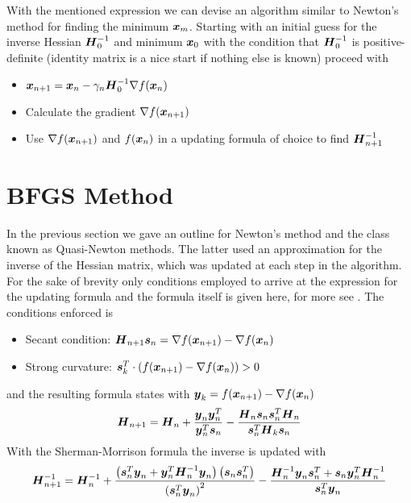     With the mentioned expression we can devise an algorithm similar to
    Newton's method for finding the minimum $\boldsymbol{{x}}_m$. Starting with an
    initial guess for the inverse Hessian $\boldsymbol{{H}}^{-1}_0$ and minimum
    $\boldsymbol{{x}}_0$ with the condition that $\boldsymbol{{H}}^{-1}_0$ is positive-definite
    (identity matrix is a nice start if nothing else is known) proceed with
        \begin{itemize}
            \item $\boldsymbol{{x}}_{n+1} = \boldsymbol{{x}}_n -\gamma_n\boldsymbol{{H}}^{-1}_0\nabla
                f(\boldsymbol{{x}}_n)$
            \item Calculate the gradient $\nabla f(\boldsymbol{{x}}_{n+1})$
            \item Use $\nabla f(\boldsymbol{{x}}_{n+1})$ and $f(\boldsymbol{{x}}_n)$ in a
                updating formula of choice to find $\boldsymbol{{H}}^{-1}_{n+1}$
        \end{itemize}

\section{BFGS Method\label{sec:BFGS}}
    In the previous section we gave an outline for Newton's method and the
    class known as Quasi-Newton methods. The latter used an approximation for
    the inverse of the Hessian matrix, which was updated at each step in the
    algorithm. For the sake of brevity only conditions employed to arrive at
    the expression for the updating formula and the formula itself is given
    here, for more see \cite{BFGSB, BFGSF, BFGSG, BFGSS, numOptNocWrig}. The
    conditions enforced is
        \begin{itemize}
            \item Secant condition: $\boldsymbol{{H}}_{n+1} \boldsymbol{{s}}_n = \nabla
                f(\boldsymbol{{x}}_{n+1}) - \nabla f(\boldsymbol{{x}}_n)$
            \item Strong curvature: $\boldsymbol{{s}}^T_k\cdot (f(\boldsymbol{{x}}_{n+1}) -
                \nabla f(\boldsymbol{{x}}_n)) > 0$
        \end{itemize}
    and the resulting formula states with $\boldsymbol{{y}}_k = f(\boldsymbol{{x}}_{n+1}) -
    \nabla f(\boldsymbol{{x}}_n)$
        \begin{equation}
            \boldsymbol{{H}}_{n+1} = \boldsymbol{{H}}_n +
            \frac{\boldsymbol{{y}}_n\boldsymbol{{y}}^T_n}{\boldsymbol{{y}}^T_n \boldsymbol{{s}}_n} -
            \frac{\boldsymbol{{H}}_n\boldsymbol{{s}}_n\boldsymbol{{s}}^T_n\boldsymbol{{H}}_n}
            {\boldsymbol{{s}}^T_n\boldsymbol{{H}}_k\boldsymbol{{s}}_n}
            \label{eq:BFGSdef}
        \end{equation}
    With the Sherman-Morrison formula\cite{shermorInv} the inverse is updated
    with
        \begin{equation}
            \boldsymbol{{H}}^{-1}_{n+1} = \boldsymbol{{H}}^{-1}_n +
            \frac{\left(\boldsymbol{{s}}^T_n\boldsymbol{{y}}_n +
            \boldsymbol{{y}}^T_n\boldsymbol{{H}}^{-1}_n\boldsymbol{{y}}_n\right)
            \left(\boldsymbol{{s}}_n\boldsymbol{{s}}^T_n\right)}
            {\left(\boldsymbol{{s}}^T_n\boldsymbol{{y}}_n\right)^2} -
            \frac{\boldsymbol{{H}}^{-1}_n\boldsymbol{{y}}_n\boldsymbol{{s}}^T_n +
            \boldsymbol{{s}}_n\boldsymbol{{y}}^T_n\boldsymbol{{H}}^{-1}_n}{\boldsymbol{{s}}^T_n\boldsymbol{{y}}_n}
            \label{eq:shermanmorrisondef}
        \end{equation}

